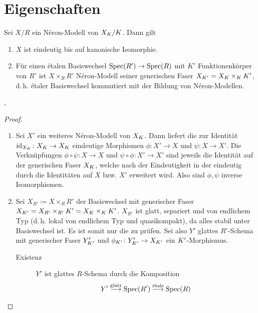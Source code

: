 \documentclass[german]{scrreprt}
\begin{document}

\section{Eigenschaften}
\begin{Satz}
  Sei $X/R$ ein Néron-Modell von $X_{K}/K$. Dann gilt
  \begin{enumerate}[label=(\roman*)]
  \item $X$ ist eindeutig bis auf kanonische Isomorphie.
  \item Für einen étalen Basiswechsel $\operatorname{Spec}(R')\to\operatorname{Spec}(R)$ mit $K'$
    Funktionenkörper von $R'$ ist $X\times_R R'$ Néron-Modell
    seiner generischen Faser $X_{K'}=X_{K}\times_{K}K'$,
    d.\,h. étaler Basiswechsel kommutiert mit der Bildung von
    Néron-Modellen.
  \end{enumerate}
  \cite[1.2, Proposition 2]{neron},
  \cite[vgl.][Proposition IV.5.2]{silverman2}
  \begin{proof}
    \begin{enumerate}[label=(\roman*)]
    \item Sei $X'$ ein weiteres Néron-Modell von $X_{K}$.
      Dann liefert die \NAbbEig zur Identität
      $\mathrm{id}_{X_{K}}\colon X_{K}\to X_{K}$ eindeutige Morphismen
      $\phi\colon X'\to X$ und $\psi\colon X\to X'$.
      Die Verknüpfungen $\phi\circ\psi\colon X\to X$ und
      $\psi\circ\phi\colon X'\to X'$ sind jeweils die Identität auf
      der generischen Faser $X_{K}$, welche nach der Eindeutigkeit in der
      \NAbbEig eindeutig durch die Identitäten auf
      $X$ bzw. $X'$ erweitert wird. Also sind $\phi,\psi$ inverse
      Isomorphismen.
    \item
      Sei $X_{R'}\coloneqq X\times_R R'$ der Basiswechsel
      mit generischer Faser
      $X_{K'}=X_{R'}\times_{R'}K'=X_{K}\times_{K}K'$.
      $X_{R'}$ ist glatt, separiert und von endlichem Typ 
      (d.\,h. lokal von endlichem Typ und quasikompakt), da alles
      stabil unter Basiswechsel ist. Es ist somit nur die
      \NAbbEig zu prüfen.
      Sei also $Y'$ glattes $R'$-Schema mit generischer Faser
      $Y_{K'}'$ und $\phi_{K'}\colon Y_{K'}'\to X_{K'}$ ein
      $K'$-Morphismus. 
      \begin{description}
      \item[Existenz] 
        $Y'$ ist glattes $R$-Schema durch die Komposition
        \begin{gather*}
          Y'\overset{\text{glatt}}{\longrightarrow}\operatorname{Spec}(R')
          \overset{\text{étale}}{\longrightarrow}\operatorname{Spec}(R)
        \end{gather*}

\end{description}
\end{enumerate}
\end{proof}
\end{Satz}
\end{document}
